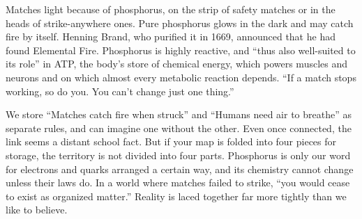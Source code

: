 Matches light because of phosphorus, on the strip of safety matches or in the heads of strike-anywhere ones. Pure phosphorus glows in the dark and may catch fire by itself. Henning Brand, who purified it in 1669, announced that he had found Elemental Fire. Phosphorus is highly reactive, and ``thus also well-suited to its role'' in ATP, the body's store of chemical energy, which powers muscles and neurons and on which almost every metabolic reaction depends.  ``If a match stops working, so do you. You can't change just one thing.''

We store ``Matches catch fire when struck'' and ``Humans need air to breathe'' as separate rules, and can imagine one without the other. Even once connected, the link seems a distant school fact. But if your map is folded into four pieces for storage, the territory is not divided into four parts. Phosphorus is only our word for electrons and quarks arranged a certain way, and its chemistry cannot change unless their laws do. In a world where matches failed to strike, ``you would cease to exist as organized matter.'' Reality is laced together far more tightly than we like to believe.
